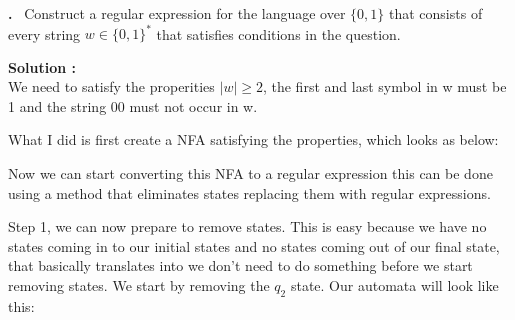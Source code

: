 \documentclass{article}
\newcounter{problem}
\newcounter{solution}
\newcommand\Problem{%
  \stepcounter{problem}%
  \textbf{\theproblem.}~%
  \setcounter{solution}{0}%
}
\newcommand\TheSolution{%
  \textbf{Solution \theproblem:}\\%
}
\begin{document}
\newpage

\Problem Construct a regular expression for the language over $\{0,1\}$ that consists of 
every string $w \in \{0,1\}^*$ that satisfies conditions in the question.

\TheSolution We need to satisfy the properities $|w| \geqslant 2$, the first and last symbol 
in w must be 1 and the string 00 must not occur in w.

What I did is first create a NFA satisfying the properties, which looks as below:


\begin{center}
\end{center}

Now we can start converting this NFA to a regular expression this can be done using a method 
that eliminates states replacing them with regular expressions.

Step 1, we can now prepare to remove states. This is easy because we have no 
states coming in to our initial states and no states coming out of our final state, that 
basically translates into we don't need to do something before we start removing states.
We start by removing the $q_2$ state. Our automata will look like this:

\begin{center}
\end{center}
\end{document}
